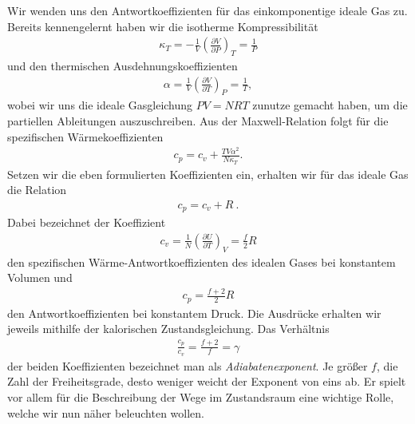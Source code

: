 Wir wenden uns den Antwortkoeffizienten für das einkomponentige ideale Gas zu. Bereits kennengelernt haben wir die isotherme Kompressibilität
\begin{align*}
    \kappa_T=-\frac{1}{V}\left(\frac{\partial V}{\partial P}\right)_T=\frac{1}{P}
\end{align*}
und den thermischen Ausdehnungskoeffizienten
\begin{align*}
    \alpha=\frac{1}{V}\left(\frac{\partial V}{\partial T}\right)_P=\frac{1}{T},
\end{align*}
wobei wir uns die ideale Gasgleichung $PV=NRT$ zunutze gemacht haben, um die partiellen Ableitungen auszuschreiben.
Aus der Maxwell-Relation folgt für die spezifischen Wärmekoeffizienten
\begin{align*}
    c_p=c_v+\frac{TV\alpha^2}{N\kappa_T}.
\end{align*}
Setzen wir die eben formulierten Koeffizienten ein, erhalten wir für das ideale Gas die Relation
\begin{align*}
    \boxed{c_p=c_v+R}\:.
\end{align*}
Dabei bezeichnet der Koeffizient
\begin{align*}
    c_v=\frac{1}{N}\left(\frac{\partial U}{\partial T}\right)_V=\frac{f}{2}R
\end{align*}
den spezifischen Wärme-Antwortkoeffizienten des idealen Gases bei konstantem Volumen und
\begin{align*}
    c_p=\frac{f+2}{2}R
\end{align*}
den Antwortkoeffizienten bei konstantem Druck. Die Ausdrücke erhalten wir jeweils mithilfe der kalorischen Zustandsgleichung.
Das Verhältnis
\begin{align*}
    \frac{c_p}{c_v}=\frac{f+2}{f}=\gamma
\end{align*}
der beiden Koeffizienten bezeichnet man als \emph{Adiabatenexponent}.
Je größer $f$, die Zahl der Freiheitsgrade, desto weniger weicht der Exponent von eins ab.
Er spielt vor allem für die Beschreibung der Wege im Zustandsraum eine wichtige Rolle, welche wir nun näher beleuchten wollen.


